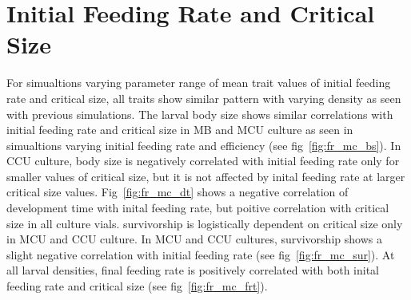 \section{Initial Feeding Rate and Critical Size}
For simualtions varying parameter range of mean trait values of initial feeding rate and critical size, all traits show similar pattern with varying density as seen with previous simulations. The larval body size shows similar correlations with initial feeding rate and critical size in MB and MCU culture as seen in simualtions varying initial feeding rate and efficiency (see fig~\ref{fig:fr_mc_bs}). In CCU culture, body size is negatively correlated with initial feeding rate only for smaller values of critical size, but it is not affected by inital feeding rate at larger critical size values. Fig~\ref{fig:fr_mc_dt} shows a negative correlation of development time with inital feeding rate, but poitive correlation with critical size in all culture vials. survivorship is logistically dependent on critical size only in MCU and CCU culture. In MCU and CCU cultures, survivorship shows a slight negative correlation with initial feeding rate (see fig~\ref{fig:fr_mc_sur}). At all larval densities, final feeding rate is positively correlated with both inital feeding rate and critical size (see fig~\ref{fig:fr_mc_frt}).
